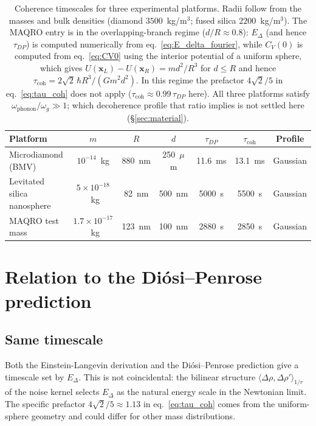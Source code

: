 \documentclass[12pt,a4paper]{article}
\theoremstyle{remark}
\begin{document}
\begin{table}[h]
\centering
\begin{tabular}{lcccccc}
\toprule
Platform & $m$ & $R$ & $d$ & $\tau_{DP}$ & $\tau_{\text{coh}}$ & Profile \\
\midrule
Microdiamond (BMV)~\cite{bose} & $10^{-14}$~kg & 880~nm & 250~$\mu$m & 11.6~ms & 13.1~ms & Gaussian \\
Levitated silica nanosphere & $5\times10^{-18}$~kg & 82~nm & 500~nm & 5000~s & 5500~s & Gaussian \\
MAQRO test mass~\cite{maqro} & $1.7\times10^{-17}$~kg & 123~nm & 100~nm & 2880~s & 2850~s & Gaussian \\
\bottomrule
\end{tabular}
\caption{Coherence timescales for three experimental platforms. Radii follow from the
masses and bulk densities (diamond $3500$~kg/m$^3$; fused silica $2200$~kg/m$^3$). The
MAQRO entry is in the overlapping-branch regime ($d/R \approx 0.8$): $E_\Delta$ (and hence
$\tau_{DP}$) is computed numerically from eq.~\eqref{eq:E_delta_fourier}, while $C_V(0)$
is computed from eq.~\eqref{eq:CV0} using the interior potential of a uniform sphere,
which gives $U(\mathbf{x}_L)-U(\mathbf{x}_R) = md^2/R^3$ for $d \le R$ and hence
$\tau_{\text{coh}} = 2\sqrt{2}\,\hbar R^3/(Gm^2d^2)$. In this regime the prefactor
$4\sqrt{2}/5$ in eq.~\eqref{eq:tau_coh} does not apply ($\tau_{\text{coh}} \approx
0.99\,\tau_{DP}$ here). All three platforms satisfy
$\omega_{\text{phonon}}/\omega_g \gg 1$; which decoherence profile that ratio implies is
not settled here (\S\ref{sec:material}).}
\label{tab:platforms}
\end{table}

\section{Relation to the Di\'osi--Penrose prediction}
\label{sec:dp_comparison}

\subsection{Same timescale}

Both the Einstein-Langevin derivation and the Di\'osi--Penrose prediction give a timescale
set by $E_\Delta$. This is not coincidental: the bilinear structure $\langle\Delta\rho,\Delta\rho'\rangle_{1/r}$
of the noise kernel selects $E_\Delta$ as the natural energy scale in the Newtonian limit. The specific prefactor
$4\sqrt{2}/5 \approx 1.13$ in eq.~\eqref{eq:tau_coh} comes from the uniform-sphere
geometry and could differ for other mass distributions.
\end{document}
